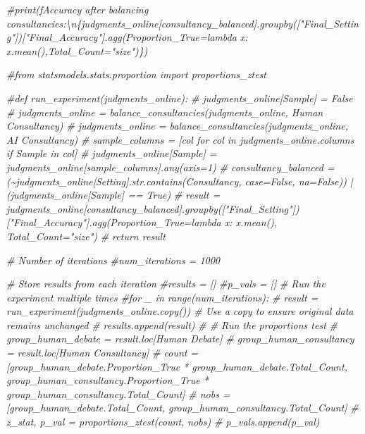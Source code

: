 \documentclass[
]{article}
\newenvironment{Shaded}{\begin{snugshade}}{\end{snugshade}}
\newcommand{\CommentTok}[1]{\textcolor[rgb]{0.56,0.35,0.01}{\textit{#1}}}
\begin{document}
\begin{Shaded}
\begin{Highlighting}[]
\CommentTok{\#print(f\textquotesingle{}Accuracy after balancing consultancies:\textbackslash{}n\{judgments\_online[consultancy\_balanced].groupby(["Final\_Setting"])["Final\_Accuracy"].agg(Proportion\_True=lambda x: x.mean(),Total\_Count="size")\}\textquotesingle{})}


\CommentTok{\#from statsmodels.stats.proportion import proportions\_ztest}

\CommentTok{\#def run\_experiment(judgments\_online):}
\CommentTok{\#    judgments\_online[\textquotesingle{}Sample\textquotesingle{}] = False}
\CommentTok{\#    judgments\_online = balance\_consultancies(judgments\_online, \textquotesingle{}Human Consultancy\textquotesingle{})}
\CommentTok{\#    judgments\_online = balance\_consultancies(judgments\_online, \textquotesingle{}AI Consultancy\textquotesingle{})}
\CommentTok{\#    sample\_columns = [col for col in judgments\_online.columns if \textquotesingle{}Sample\textquotesingle{} in col]}
\CommentTok{\#    judgments\_online[\textquotesingle{}Sample\textquotesingle{}] = judgments\_online[sample\_columns].any(axis=1)}
\CommentTok{\#    consultancy\_balanced = (\textasciitilde{}judgments\_online[\textquotesingle{}Setting\textquotesingle{}].str.contains(\textquotesingle{}Consultancy\textquotesingle{}, case=False, na=False)) | (judgments\_online[\textquotesingle{}Sample\textquotesingle{}] == True)}
\CommentTok{\#    result = judgments\_online[consultancy\_balanced].groupby(["Final\_Setting"])["Final\_Accuracy"].agg(Proportion\_True=lambda x: x.mean(), Total\_Count="size")}
\CommentTok{\#    return result}

\CommentTok{\# Number of iterations}
\CommentTok{\#num\_iterations = 1000}

\CommentTok{\# Store results from each iteration}
\CommentTok{\#results = []}
\CommentTok{\#p\_vals = []}
\CommentTok{\# Run the experiment multiple times}
\CommentTok{\#for \_ in range(num\_iterations):}
\CommentTok{\#    result = run\_experiment(judgments\_online.copy())  \# Use a copy to ensure original data remains unchanged}
\CommentTok{\#    results.append(result)}
\CommentTok{\#    \# Run the proportions test}
\CommentTok{\#    group\_human\_debate = result.loc[\textquotesingle{}Human Debate\textquotesingle{}]}
\CommentTok{\#    group\_human\_consultancy = result.loc[\textquotesingle{}Human Consultancy\textquotesingle{}]}
\CommentTok{\#    count = [group\_human\_debate.Proportion\_True * group\_human\_debate.Total\_Count, group\_human\_consultancy.Proportion\_True * group\_human\_consultancy.Total\_Count]}
\CommentTok{\#    nobs = [group\_human\_debate.Total\_Count, group\_human\_consultancy.Total\_Count]}
\CommentTok{\#    z\_stat, p\_val = proportions\_ztest(count, nobs)}
\CommentTok{\#    p\_vals.append(p\_val)}


\end{Highlighting}
\end{Shaded}
\end{document}
